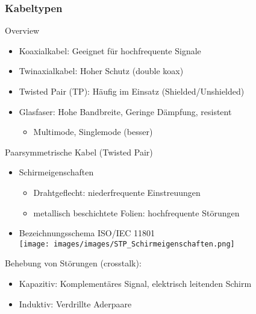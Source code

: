     

    \subsubsection{Kabeltypen}
    \begin{concept}{Overview}
        \begin{itemize}
            \item Koaxialkabel: Geeignet für hochfrequente Signale
            \item Twinaxialkabel: Hoher Schutz (double koax)
            \item Twisted Pair (TP): Häufig im Einsatz (Shielded/Unshielded)
            \item Glasfaser: Hohe Bandbreite, Geringe Dämpfung, resistent
                \begin{itemize}
                    \item Multimode, Singlemode (besser)
                \end{itemize}
        \end{itemize}        
    \end{concept}

    \begin{definition}{Paarsymmetrische Kabel (Twisted Pair)}
        \begin{itemize}
            \item Schirmeigenschaften
            \begin{itemize}
                \item Drahtgeflecht: niederfrequente Einstreuungen
                \item metallisch beschichtete Folien: hochfrequente Störungen
            \end{itemize}
            \item Bezeichnungsschema ISO/IEC 11801\\
            \texttt{[image: images/images/STP\_Schirmeigenschaften.png]}
        \end{itemize}
        Behebung von Störungen (crosstalk):
        \begin{itemize}
            \item Kapazitiv: Komplementäres Signal, elektrisch leitenden Schirm
            \item Induktiv: Verdrillte Aderpaare
        \end{itemize}
    \end{definition}

    

    
        
    